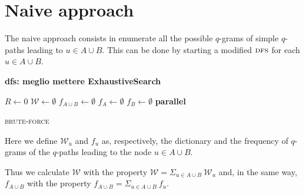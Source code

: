\section{Naive approach}

	The naive approach consists in enumerate all the possible $q$-grams of simple $q$-paths leading to $u \in A \cup B$. 
	This can be done by starting a modified $\textsc{dfs}$ for each $u \in A \cup B$.
	
	\textbf{dfs: meglio mettere ExhaustiveSearch}
	
	
    \begin{algorithm}[h]
    \small
    \DontPrintSemicolon
    \BlankLine
    $R \gets 0$\;
	$\mathcal{W} \gets \emptyset$\;
	$f_{A \cup B} \gets \emptyset$ \quad \;    
	$f_{A} \gets \emptyset$\; 
	$f_{B} \gets \emptyset$\; 
	\BlankLine
    \textbf{parallel} 
	\BlankLine    
	\BlankLine
    \caption{\textsc{brute-force}}
    \label{alg:brute-force}
    \end{algorithm}

	Here we define $\mathcal{W}_{u}$ and $f_{u}$ as, respectively, the dictionary and the frequency of $q$-grams of the $q$-paths leading to the node $u \in A \cup B$.
	 
	Thus we calculate $\mathcal{W}$ with the property $\mathcal{W} = \Sigma_{u \in A \cup B}{\ \mathcal{W}_{u} }$ and, in the same way, $f_{A \cup B}$ with the property
	$f_{A \cup B} = \Sigma_{u \in A \cup B}{\ f_{u} }$.
	
